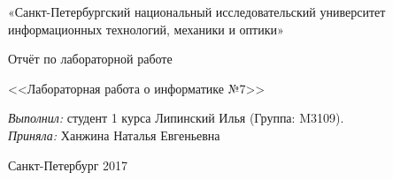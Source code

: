 \documentclass[a4paper,12pt]{article}
\begin{document}

\begin{titlepage}
\newpage
\begin{center}
\large «Санкт-Петербургский национальный исследовательский университет информационных технологий, механики и оптики»\\ \hrulefill
\end{center}
\vspace{8em}
\begin{center}
\huge Отчёт по лабораторной работе\\ [10pt]
\end{center}
\vspace{2.5em}
\begin{center}
\large <<Лабораторная работа о информатике №7>>\\
\end{center}

\vspace{6em}

\begin{flushleft}
\emph{Выполнил:} студент 1 курса Липинский Илья (Группа: M3109).\\
\vspace{2.5em}
\emph{Приняла:} Ханжина Наталья Евгеньевна \\
\end{flushleft}

\vspace{\fill}

\begin{center}
Санкт-Петербург 2017
\end{center}

\end{titlepage}
\end{document}
